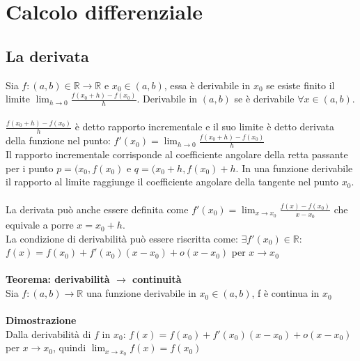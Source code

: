 \documentclass{article}
\begin{document}
\section{Calcolo differenziale}
\subsection{La derivata}
Sia $f:(a,b)\in\mathds{R}\rightarrow\mathds{R}$ e $x_0\in(a,b)$, essa è derivabile in $x_0$ se esiste finito il limite $\lim_{h\rightarrow0}\frac{f(x_0+h)-f(x_0)}{h}$. Derivabile in $(a,b)$ se è derivabile $\forall x\in(a,b)$.\\\\
$\frac{f(x_0+h)-f(x_0)}{h}$ è detto rapporto incrementale e il suo limite è detto derivata della funzione nel punto: $f'(x_0)=\lim_{h\rightarrow0}\frac{f(x_0+h)-f(x_0)}{h}$\\
Il rapporto incrementale corrisponde al coefficiente angolare della retta passante per i punto $p=(x_0,f(x_0)$ e $q=(x_0+h,f(x_0)+h$. In una funzione derivabile il rapporto al limite raggiunge il coefficiente angolare della tangente nel punto $x_0$.\\\\
La derivata può anche essere definita come $f'(x_0)=\lim_{x\rightarrow x_0}\frac{f(x)-f(x_0)}{x-x_0}$ che equivale a porre $x=x_0+h$.\\
La condizione di derivabilità può essere riscritta come: $\exists f'(x_0)\in\mathds{R}:$ $f(x)=f(x_0)+f'(x_0)(x-x_0)+o(x-x_0)$ per $x\rightarrow x_0$\\\\
\textbf{Teorema: derivabilità $\rightarrow$ continuità}\\
Sia $f:(a,b)\rightarrow\mathds{R}$ una funzione derivabile in $x_0\in(a,b)$, f è continua in $x_0$\\\\
\textbf{Dimostrazione}\\
Dalla derivabilità di $f$ in $x_0$: $f(x)=f(x_0)+f'(x_0)(x-x_0)+o(x-x_0)$ per $x\rightarrow x_0$, quindi $\lim_{x\rightarrow x_0}f(x)=f(x_0)$
\end{document}
